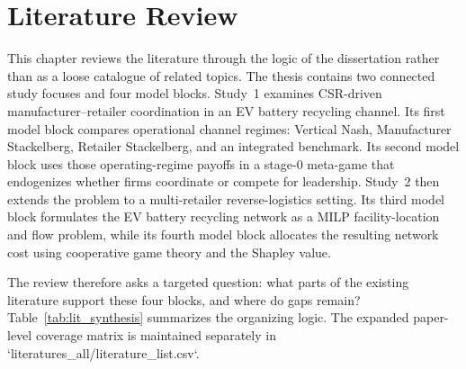 \chapter{Literature Review}
\label{chap:literature_review}

This chapter reviews the literature through the logic of the dissertation rather than as a loose catalogue of related topics. The thesis contains two connected study focuses and four model blocks. Study~1 examines CSR-driven manufacturer--retailer coordination in an EV battery recycling channel. Its first model block compares operational channel regimes: Vertical Nash, Manufacturer Stackelberg, Retailer Stackelberg, and an integrated benchmark. Its second model block uses those operating-regime payoffs in a stage-0 meta-game that endogenizes whether firms coordinate or compete for leadership. Study~2 then extends the problem to a multi-retailer reverse-logistics setting. Its third model block formulates the EV battery recycling network as a MILP facility-location and flow problem, while its fourth model block allocates the resulting network cost using cooperative game theory and the Shapley value.

The review therefore asks a targeted question: what parts of the existing literature support these four blocks, and where do gaps remain? Table~\ref{tab:lit_synthesis} summarizes the organizing logic. The expanded paper-level coverage matrix is maintained separately in `literatures_all/literature_list.csv`.

